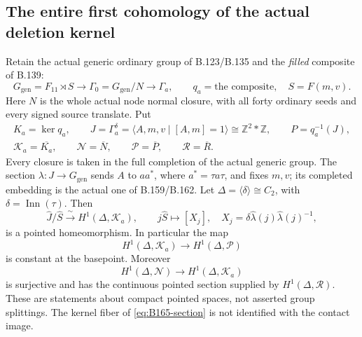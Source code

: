\subsection*{The entire first cohomology of the actual deletion kernel}
\label{stmt:B165}
Retain the actual generic ordinary group of B.123/B.135 and the
\emph{filled} composite of B.139:
\begin{equation}\label{eq:B165-filled}
 G_{\mathrm{gen}}=F_{11}\rtimes S
 \longrightarrow \Gamma_0=G_{\mathrm{gen}}/N
 \longrightarrow\Gamma_a,\qquad q_a=\text{the composite},
 \quad S=F(m,v).
\end{equation}
Here \(N\) is the whole actual node normal closure, with all forty
ordinary seeds and every signed source translate. Put
\[
 \begin{gathered}
 K_a=\ker q_a,\qquad
 J=\Gamma_a^\delta
   =\langle A,m,v\mid[A,m]=1\rangle\cong\mathbb Z^2*\mathbb Z,
 \qquad P=q_a^{-1}(J),\\
 \mathcal K_a=\overline{K_a},\qquad
 \mathcal N=\overline N,\qquad
 \mathcal P=\overline P,\qquad
 \mathcal R=\overline R .
 \end{gathered}
\]
Every closure is taken in the full completion of the actual generic
group. The section \(\lambda:J\to G_{\mathrm{gen}}\) sends
\(A\) to \(aa^*\), where \(a^*=\tau a\tau\), and fixes \(m,v\);
its completed embedding is the actual one of B.159/B.162.
Let \(\Delta=\langle\delta\rangle\cong C_2\), with
\(\delta=\operatorname{Inn}(\tau)\). Then
\begin{equation}\label{eq:B165-entire}
 \widehat J/\widehat S
 \xrightarrow{\ \sim\ } H^1(\Delta,\mathcal K_a),
 \qquad
 j\widehat S\longmapsto[X_j],
 \quad X_j=\delta\widehat\lambda(j)\widehat\lambda(j)^{-1},
\end{equation}
is a pointed homeomorphism. In particular the map
\[
 H^1(\Delta,\mathcal K_a)\longrightarrow H^1(\Delta,\mathcal P)
\]
is constant at the basepoint. Moreover
\begin{equation}\label{eq:B165-section}
 H^1(\Delta,\mathcal N)\longrightarrow H^1(\Delta,\mathcal K_a)
\end{equation}
is surjective and has the continuous pointed section supplied by
\(H^1(\Delta,\mathcal R)\). These are statements about compact
pointed spaces, not asserted group splittings. The kernel fiber of
\eqref{eq:B165-section} is not identified with the contact image.

